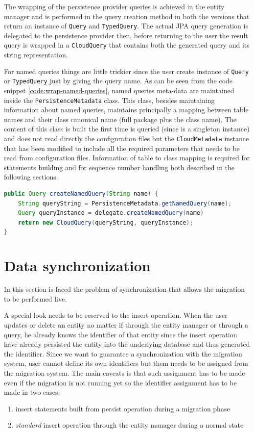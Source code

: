 \noindent The wrapping of the persistence provider queries is achieved in the entity manager and is performed in the query creation method  in both the versions that return an instance of \texttt{Query} and \texttt{TypedQuery}. The actual JPA query generation is delegated to the persistence provider then, before returning to the user the result query is wrapped in a \texttt{CloudQuery} that contains both the generated query and its string representation.

\newparagraph For named queries things are little trickier since the user create instance of \texttt{Query} or \texttt{TypedQuery} just by giving the query name.
\noindent As can be seen from the code snippet \ref{code:wrap-named-queries}, named queries meta-data are maintained inside the \texttt{PersistenceMetadata} class. This class, besides maintaining information about named queries, maintains principally a mapping between table names and their class canonical name (full package plus the class name). The content of this class is built the first time is queried (since is a singleton instance) and does not read directly the  configuration files but the \texttt{CloudMetadata} instance that has been modified to include all the required parameters that needs to be read from configuration files. 
Information of table to class mapping is required for statements building and for sequence number handling both described in the following sections.

\begin{lstlisting}[language=Java, caption=Wrap named queries, label=code:wrap-named-queries]
public Query createNamedQuery(String name) {
    String queryString = PersistenceMetadata.getNamedQuery(name);
    Query queryInstance = delegate.createNamedQuery(name)
    return new CloudQuery(queryString, queryInstance);
}
\end{lstlisting}

\section{Data synchronization}
\label{sec:sync}
In this section is faced the problem of synchronization that allows the migration to be performed live.

\noindent A special look needs to be reserved to the insert operation. When the user updates or delete an entity no matter if through the entity manager or through a query, he already knows the identifier of that entity since the insert operation have already persisted the entity into the underlying database and thus generated the identifier.
Since we want to guarantee a synchronization with the migration system, user cannot define its own identifiers but them needs to be assigned from the migration system.
The main caveats is that such assignment has to be made even if the migration is not running yet so the identifier assignment has to be made in two cases:
\begin{enumerate}
\item insert statements built from persist operation during a migration phase
\item \textit{standard} insert operation through the entity manager during a normal state
\end{enumerate}

